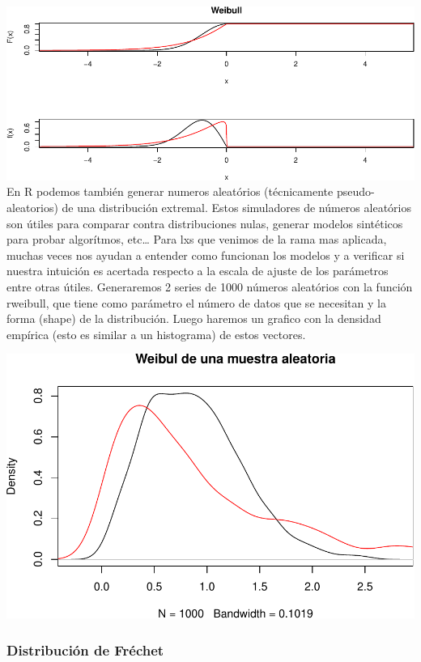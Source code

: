 \documentclass[
]{book}
\theoremstyle{definition}
\theoremstyle{definition}
\theoremstyle{definition}
\theoremstyle{definition}
\theoremstyle{remark}
\begin{document}
\includegraphics{_main_files/figure-latex/unnamed-chunk-8-1.pdf}
En R podemos también generar numeros aleatórios (técnicamente pseudo-aleatorios) de una distribución extremal. Estos simuladores de números aleatórios son útiles para comparar contra distribuciones nulas, generar modelos sintéticos para probar algorítmos, etc\ldots{}
Para lxs que venimos de la rama mas aplicada, muchas veces nos ayudan a entender como funcionan los modelos y a verificar si nuestra intuición es acertada respecto a la escala de ajuste de los parámetros entre otras útiles. Generaremos 2 series de 1000 números aleatórios con la función rweibull, que tiene como parámetro el número de datos que se necesitan y la forma (shape) de la distribución. Luego haremos un grafico con la densidad empírica (esto es similar a un histograma) de estos vectores.

\includegraphics{_main_files/figure-latex/unnamed-chunk-9-1.pdf}

\subsubsection{Distribución de Fréchet}\label{distribuciuxf3n-de-fruxe9chet}
\end{document}
